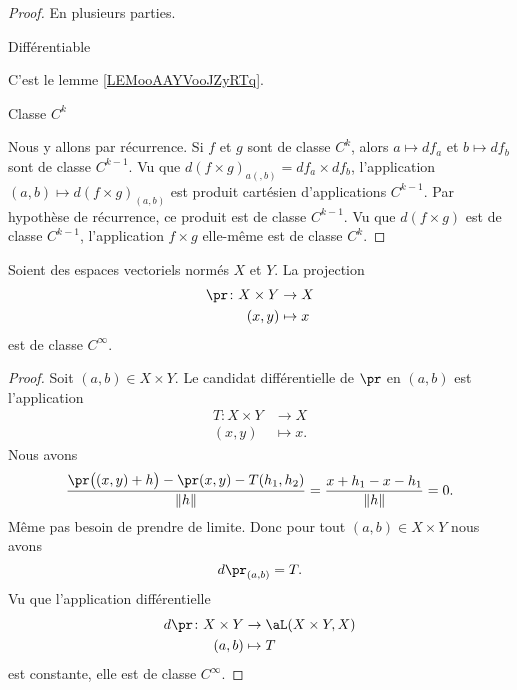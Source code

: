 \begin{proof}
	En plusieurs parties.
	\begin{proofpart}
		Différentiable
	\end{proofpart}
	C'est le lemme \ref{LEMooAAYVooJZyRTq}.
	\begin{proofpart}
		Classe \( C^k\)
	\end{proofpart}
	Nous y allons par récurrence. Si  \( f\) et \( g\) sont de classe \( C^k\), alors \( a\mapsto df_a\) et \( b\mapsto df_b\) sont de classe \( C^{k-1}\). Vu que \( d(f\times g)_{a(,b)}=df_a\times df_b\), l'application \( (a,b)\mapsto  d(f\times g)_{(a,b)}\) est produit cartésien d'applications \( C^{k-1}\). Par hypothèse de récurrence, ce produit est de classe \( C^{k-1}\). Vu que \( d(f\times g)\) est de classe \( C^{k-1}\), l'application \( f\times g\) elle-même est de classe \( C^k\).
\end{proof}


\begin{proposition}	\label{PROPooCILMooHCcOYU}
	Soient des espaces vectoriels normés \( X\) et \( Y\). La projection
	\begin{equation}
		\begin{aligned}
			\pr\colon X\times Y & \to X     \\
			(x,y)               & \mapsto x
		\end{aligned}
	\end{equation}
	est de classe \( C^{\infty}\).
\end{proposition}

\begin{proof}
	Soit \( (a,b)\in X\times Y\). Le candidat différentielle de \( \pr\) en \( (a,b)\) est l'application
	\begin{equation}
		\begin{aligned}
			T\colon X\times Y & \to X      \\
			(x,y)             & \mapsto x.
		\end{aligned}
	\end{equation}
	Nous avons
	\begin{equation}
		\frac{ \pr\big( (x,y)+h \big)-\pr(x,y)-T(h_1,h_2) }{ \| h \| }=\frac{ x+h_1-x-h_1 }{ \| h \| }=0.
	\end{equation}
	Même pas besoin de prendre de limite. Donc pour tout \( (a,b)\in X\times Y\) nous avons
	\begin{equation}
		d\pr_{(a,b)}=T.
	\end{equation}
	Vu que l'application différentielle
	\begin{equation}
		\begin{aligned}
			d\pr\colon X\times Y & \to \aL(X\times Y,X) \\
			(a,b)                & \mapsto T
		\end{aligned}
	\end{equation}
	est constante, elle est de classe \( C^{\infty}\).
\end{proof}

